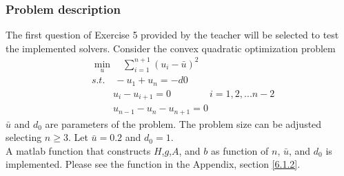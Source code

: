 \subsubsection{\bfseries Problem description}
The first question of Exercise 5 provided by the teacher will be selected to test the implemented solvers. Consider the convex quadratic optimization problem\\
\begin{align*}
&\min_{u} \quad \sum_{i=1}^{n+1} \left(u_i-\bar{u}\right)^2 \tag{1.9}\\
& s.t. \quad -u_1+u_n=-d0\\
& \quad \quad \ u_i-u_{i+1}=0 \qquad \qquad i=1,2,...n-2\\
& \quad \quad \ u_{n-1}-u_n-u_{n+1}=0
\end{align*}
$\bar{u}$ and $d_0$ are parameters of the problem. The problem size can be adjusted selecting
$n \ge 3$. Let $\bar{u} = 0.2$ and $d_0 = 1$. \\
A matlab function that constructs $H$,$g$,$A$, and $b$ as function of $n$, $\bar{u}$, and $d_0$ is implemented. Please see the function in the Appendix, section \ref{6.1.2}.
